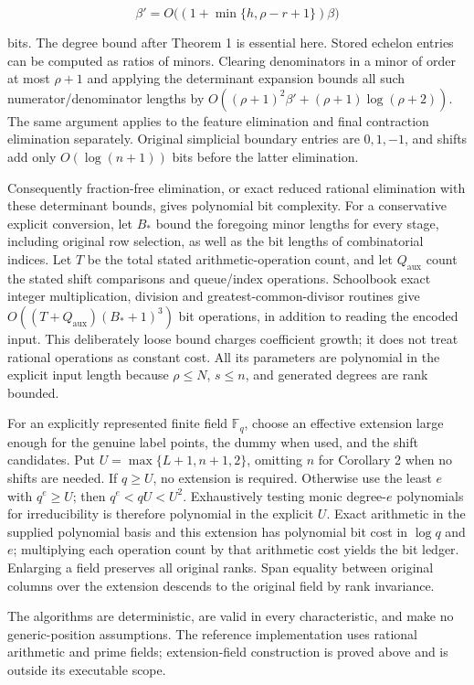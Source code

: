 \[
\beta'=O\bigl((1+\min\{h,\rho-r+1\})\beta\bigr)
\tag{13}
\]

bits. The degree bound after Theorem 1 is essential here. Stored echelon entries can be computed as ratios of minors. Clearing denominators in a minor of order at most \(\rho+1\) and applying the determinant expansion bounds all such numerator/denominator lengths by \(O((\rho+1)^2\beta'+(\rho+1)\log(\rho+2))\). The same argument applies to the feature elimination and final contraction elimination separately. Original simplicial boundary entries are \(0,1,-1\), and shifts add only \(O(\log(n+1))\) bits before the latter elimination.

Consequently fraction-free elimination, or exact reduced rational elimination with these determinant bounds, gives polynomial bit complexity. For a conservative explicit conversion, let \(B_*\) bound the foregoing minor lengths for every stage, including original row selection, as well as the bit lengths of combinatorial indices. Let \(T\) be the total stated arithmetic-operation count, and let \(Q_{\mathrm{aux}}\) count the stated shift comparisons and queue/index operations. Schoolbook exact integer multiplication, division and greatest-common-divisor routines give \(O((T+Q_{\mathrm{aux}})(B_*+1)^3)\) bit operations, in addition to reading the encoded input. This deliberately loose bound charges coefficient growth; it does not treat rational operations as constant cost. All its parameters are polynomial in the explicit input length because \(\rho\le N\), \(s\le n\), and generated degrees are rank bounded.

For an explicitly represented finite field \(\mathbb F_q\), choose an effective extension large enough for the genuine label points, the dummy when used, and the shift candidates. Put \(U=\max\{L+1,n+1,2\}\), omitting \(n\) for Corollary 2 when no shifts are needed. If \(q\ge U\), no extension is required. Otherwise use the least \(e\) with \(q^e\ge U\); then \(q^e<qU<U^2\). Exhaustively testing monic degree-\(e\) polynomials for irreducibility is therefore polynomial in the explicit \(U\). Exact arithmetic in the supplied polynomial basis and this extension has polynomial bit cost in \(\log q\) and \(e\); multiplying each operation count by that arithmetic cost yields the bit ledger. Enlarging a field preserves all original ranks. Span equality between original columns over the extension descends to the original field by rank invariance.

The algorithms are deterministic, are valid in every characteristic, and make no generic-position assumptions. The reference implementation uses rational arithmetic and prime fields; extension-field construction is proved above and is outside its executable scope.

